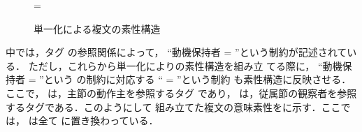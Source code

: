 \newsavebox{\myboxc}
\newsavebox{\myboxb}
\newsavebox{\myboxbbb}
\begin{figure}[htbp]
\begin{center}
\footnotesize
{}=
\end{center}
\caption{単一化による複文の素性構造}
\end{figure}

 中では，タグ  の参照関係によって， ``動機保持者 =
''という制約が記述されている．
ただし，これらから単一化によりの素性構造を組み立
てる際に， ``動機保持者 = ''という
の制約に対応する `` = ''という制約
も素性構造に反映させる．ここで， は，主節の動作主を参照するタグ
であり， は，従属節の観察者を参照するタグである．このようにして
組み立てた複文の意味素性をに示す．ここでは， は全て  に置き換わっている．

